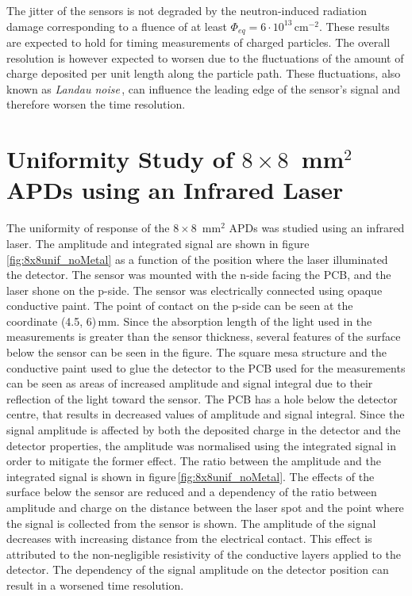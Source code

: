 \documentclass[3p,preprint,twocolumn]{elsarticle}
\begin{document}
The jitter of the sensors is not degraded by the neutron-induced radiation damage corresponding to a fluence of at least $\Phi_{eq} = 6 \cdot 10^{13}$\,cm$^{-2}$.
These results are expected to hold for timing measurements of charged particles.
The overall resolution is however expected to worsen due to the fluctuations of the amount of charge deposited per unit length along the particle path.
These fluctuations, also known as {\em Landau noise}\,\cite{cartiglia2017}, can influence the leading edge of the sensor's signal and therefore worsen the time resolution.

\section{Uniformity Study of $8 \times 8$~mm$^2$ APDs using an Infrared Laser}
\label{sec:unif8x8laser}

The uniformity of response of the $8 \times 8$~mm$^2$ APDs was studied using an infrared laser.
The amplitude and integrated signal are shown in figure\,\ref{fig:8x8unif_noMetal} as a function of the position where the laser illuminated the detector.
The sensor was mounted with the n-side facing the PCB, and the laser shone on the p-side.
The sensor was electrically connected using opaque conductive paint.
The point of contact on the p-side can be seen at the coordinate (4.5, 6)\,mm.
Since the absorption length of the light used in the measurements is greater than the sensor thickness, several features of the surface below the sensor can be seen in the figure.
The square mesa structure and the conductive paint used to glue the detector to the PCB used for the measurements can be seen as areas of increased amplitude and signal integral due to their reflection of the light toward the sensor.
The PCB has a hole below the detector centre, that results in decreased values of amplitude and signal integral.
Since the signal amplitude is affected by both the deposited charge in the detector and the detector properties, the amplitude was normalised using the integrated signal in order to mitigate the former effect.
The ratio between the amplitude and the integrated signal is shown in figure\,\ref{fig:8x8unif_noMetal}.
The effects of the surface below the sensor are reduced and a dependency of the ratio between amplitude and charge on the distance between the laser spot and the point where the signal is collected from the sensor is shown.
The amplitude of the signal decreases with increasing distance from the electrical contact.
This effect is attributed to the non-negligible resistivity of the conductive layers applied to the detector.
The dependency of the signal amplitude on the detector position can result in a worsened time resolution.
\end{document}

